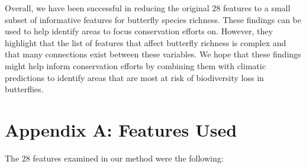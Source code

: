 \documentclass[prl,showpacs,superscriptaddress,twocolumn,longbibliography]{revtex4-1}
\begin{document}
Overall, we have been successful in reducing the original 28 features to a small subset of informative features for butterfly species richness. These findings can be used to help identify areas to focus conservation efforts on. However, they highlight that the list of features that affect butterfly richness is complex and that many connections exist between these variables. We hope that these findings might help inform conservation efforts by combining them with climatic predictions to identify areas that are most at risk of biodiversity loss in butterflies.





\onecolumngrid
\appendix

\section{Appendix A: Features Used} \label{appendix:raw}
The 28 features examined in our method were the following:
\end{document}

